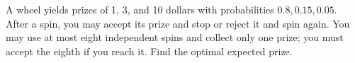 A wheel yields prizes of 1, 3, and 10 dollars with probabilities $0.8,0.15,0.05$. After a spin, you may accept its prize and stop or reject it and spin again. You may use at most eight independent spins and collect only one prize; you must accept the eighth if you reach it. Find the optimal expected prize.
